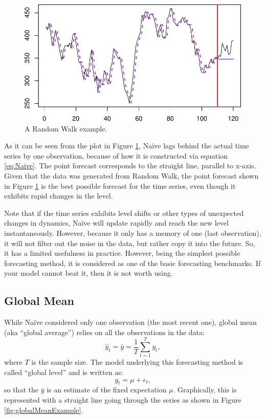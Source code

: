 \documentclass[
]{book}
\theoremstyle{definition}
\theoremstyle{definition}
\theoremstyle{definition}
\theoremstyle{definition}
\theoremstyle{remark}
\begin{document}
\begin{figure}
\centering
\includegraphics{adam_files/figure-latex/naiveExample-1.pdf}
\caption{\label{fig:naiveExample}A Random Walk example.}
\end{figure}

As it can be seen from the plot in Figure \ref{fig:naiveExample}, Naïve lags behind the actual time series by one observation, because of how it is constructed via equation \eqref{eq:Naive}. The point forecast corresponds to the straight line, parallel to x-axis. Given that the data was generated from Random Walk, the point forecast shown in Figure \ref{fig:naiveExample} is the best possible forecast for the time series, even though it exhibits rapid changes in the level.

Note that if the time series exhibits level shifts or other types of unexpected changes in dynamics, Naïve will update rapidly and reach the new level instantaneously. However, because it only has a memory of one (last observation), it will not filter out the noise in the data, but rather copy it into the future. So, it has a limited usefulness in practice. However, being the simplest possible forecasting method, it is considered as one of the basic forecasting benchmarks. If your model cannot beat it, then it is not worth using.

\hypertarget{GlobalMean}{%
\subsection{Global Mean}\label{GlobalMean}}

While Naïve considered only one observation (the most recent one), global mean (aka ``global average'') relies on all the observations in the data:
\begin{equation}
    \hat{y}_t = \bar{y} = \frac{1}{T} \sum_{t=1}^T y_{t} ,
    \label{eq:GlobalMean}
\end{equation}
where \(T\) is the sample size. The model underlying this forecasting method is called ``global level'' and is written as:
\begin{equation}
    y_t = \mu + \epsilon_t,
    \label{eq:GlobalLevel}
\end{equation}
so that the \(\bar{y}\) is an estimate of the fixed expectation \(\mu\). Graphically, this is represented with a straight line going through the series as shown in Figure \ref{fig:globalMeanExample}.
\end{document}
